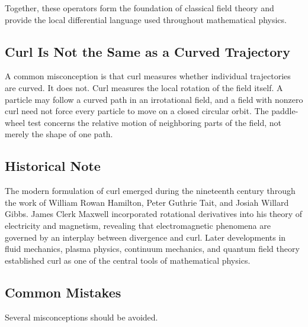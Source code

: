 Together, these operators form the foundation of classical field theory and
provide the local differential language used throughout mathematical physics.

\subsection{Curl Is Not the Same as a Curved Trajectory}

A common misconception is that curl measures whether individual trajectories
are curved. It does not. Curl measures the local rotation of the field itself.
A particle may follow a curved path in an irrotational field, and a field with
nonzero curl need not force every particle to move on a closed circular orbit.
The paddle-wheel test concerns the relative motion of neighboring parts of the
field, not merely the shape of one path.

\subsection{Historical Note}

The modern formulation of curl emerged during the nineteenth century through
the work of William Rowan Hamilton, Peter Guthrie Tait, and Josiah Willard
Gibbs. James Clerk Maxwell incorporated rotational derivatives into his theory
of electricity and magnetism, revealing that electromagnetic phenomena are
governed by an interplay between divergence and curl. Later developments in
fluid mechanics, plasma physics, continuum mechanics, and quantum field theory
established curl as one of the central tools of mathematical physics.

\subsection{Common Mistakes}

Several misconceptions should be avoided.

